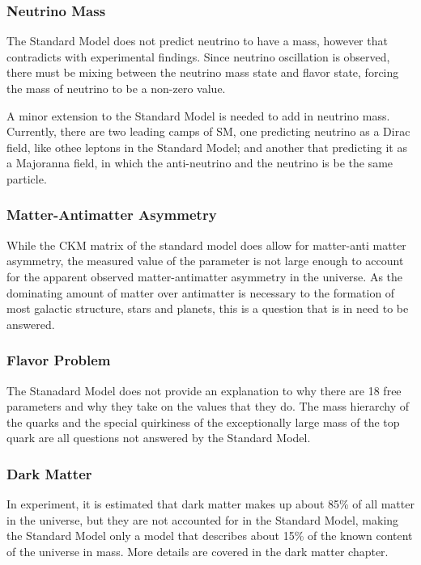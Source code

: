 \subsubsection{Neutrino Mass}
The Standard Model does not predict neutrino to have a mass, however that contradicts with experimental findings. Since neutrino oscillation is observed, there must be mixing between the neutrino mass state and flavor state, forcing the mass of neutrino to be a non-zero value. 

A minor extension to the Standard Model is needed to add in neutrino mass. Currently, there are two leading camps of \nu SM, one predicting neutrino as a Dirac field, like othee leptons in the Standard Model; and another that predicting it as a Majoranna field, in which the anti-neutrino and the neutrino is be the same particle. 



\subsubsection{Matter-Antimatter Asymmetry}
While the CKM matrix of the standard model does allow for matter-anti matter asymmetry, the measured value of the parameter is not large enough to account for the apparent observed matter-antimatter asymmetry in the universe. As the dominating amount of matter over antimatter is necessary to the formation of most galactic structure, stars and planets, this is a question that is in need to be answered.

\subsubsection{Flavor Problem}
The Stanadard Model does not provide an explanation to why there are 18 free parameters and why they take on the values that they do. The mass hierarchy of the quarks and the special quirkiness of the exceptionally large mass of the top quark are all questions not answered by the Standard Model. 


\subsubsection{Dark Matter}
In experiment, it is estimated that dark matter makes up about 85\% of all matter in the universe, but they are not accounted for in the Standard Model, making the Standard Model only a model that describes about 15\% of the known content of the universe in mass. More details are covered in the dark matter chapter. 


